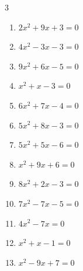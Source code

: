 \begin{multicols}{3}
\begin{enumerate}
\resetques

  \item $2x^{2}+9x+3=0$


  \item $4x^{2}-3x-3=0$


  \item $9x^{2}+6x-5=0$


  \item $x^{2}+x-3=0$


  \item $6x^{2}+7x-4=0$


  \item $5x^{2}+8x-3=0$


  \item $5x^{2}+5x-6=0$


\columnbreak %

  \item $x^{2}+9x+6=0$


  \item $8x^{2}+2x-3=0$


  \item $7x^{2}-7x-5=0$


  \item $4x^{2}-7x=0$


  \item $x^{2}+x-1=0$


  \item $x^{2}-9x+7=0$


\end{enumerate}
\end{multicols}
